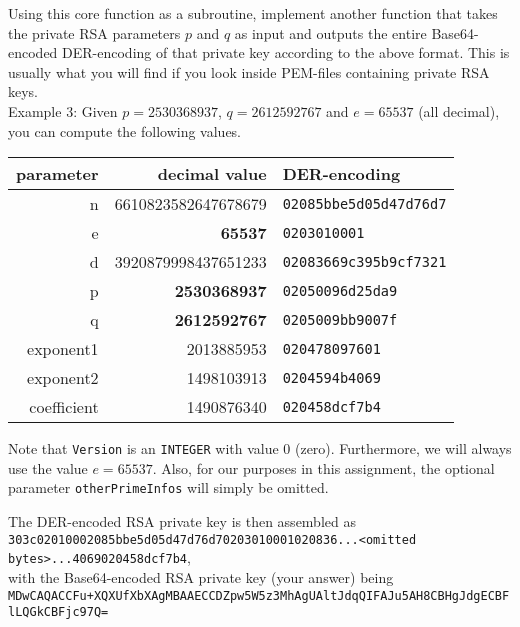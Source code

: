 \documentclass{article}
\begin{document}
\begin{description}
{				Using this core function as a subroutine, implement another function that takes the private RSA parameters $p$ and $q$ as input and outputs the entire Base64-encoded DER-encoding of that private key according to the above format. This is usually what you will find if you look inside PEM-files containing private RSA keys.\\
				
				Example 3: Given $p=2530368937$, $q=2612592767$ and $e=65537$ (all decimal), you can compute the following values.\\
				\begin{center}
					\begin{tabular}{rrl}
						parameter & decimal value & DER-encoding\\\hline
						n & 6610823582647678679 & \verb!02085bbe5d05d47d76d7!\\
						e & \textbf{65537} & \verb!0203010001!\\
						d & 3920879998437651233 & \verb!02083669c395b9cf7321!\\
						p & \textbf{2530368937} & \verb!02050096d25da9!\\
						q & \textbf{2612592767} & \verb!0205009bb9007f!\\
						exponent1 & 2013885953 & \verb!020478097601!\\
						exponent2 & 1498103913 & \verb!0204594b4069!\\
						coefficient & 1490876340 & \verb!020458dcf7b4!
					\end{tabular}
				\end{center}
				
				Note that \verb!Version! is an \verb!INTEGER! with value $0$ (zero). Furthermore, we will always use the value $e=65537$. Also, for our purposes in this assignment, the optional parameter \verb!otherPrimeInfos! will simply be omitted.
				
				The DER-encoded RSA private key is then assembled as\\
				
				\verb!303c02010002085bbe5d05d47d76d70203010001020836...<omitted bytes>...4069020458dcf7b4!,\\
				
				with the Base64-encoded RSA private key (your answer) being\\
				
				\verb!MDwCAQACCFu+XQXUfXbXAgMBAAECCDZpw5W5z3MhAgUAltJdqQIFAJu5AH8CBHgJdgECBFlLQGkCBFjc97Q=!\\
				
}
\end{description}
\end{document}
